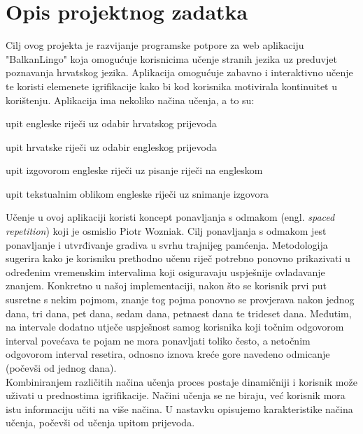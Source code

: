 \chapter{Opis projektnog zadatka}

		Cilj ovog projekta je razvijanje programske potpore za web aplikaciju "BalkanLingo" koja omogućuje korisnicima učenje stranih jezika uz preduvjet poznavanja hrvatskog jezika. Aplikacija omogućuje zabavno i interaktivno učenje te koristi elemenete igrifikacije kako bi kod korisnika motivirala kontinuitet u korištenju.
		Aplikacija ima nekoliko načina učenja, a to su: 
		\begin{packed_item}
			\item upit engleske riječi uz odabir hrvatskog prijevoda
			\item upit hrvatske riječi uz odabir engleskog prijevoda
			\item upit izgovorom engleske riječi uz pisanje riječi na engleskom
			\item upit tekstualnim oblikom engleske riječi uz snimanje izgovora
		\end{packed_item}
\newline
		Učenje u ovoj aplikaciji koristi  koncept ponavljanja s odmakom (engl. \textit{spaced repetition}) koji je osmislio Piotr Wozniak. Cilj ponavljanja s odmakom jest ponavljanje i utvrđivanje gradiva u svrhu trajnijeg pamćenja. Metodologija sugerira kako je korisniku prethodno učenu riječ potrebno ponovno prikazivati u određenim vremenskim intervalima koji osiguravaju uspješnije ovladavanje znanjem.
		\newline
		\newline
		Konkretno u našoj implementaciji, nakon što se korisnik prvi put susretne s nekim pojmom, znanje tog pojma ponovno se provjerava nakon jednog dana, tri dana, pet dana, sedam dana, petnaest dana te trideset dana. Međutim, na intervale dodatno utječe uspješnost samog korisnika koji točnim odgovorom interval povećava te pojam ne mora ponavljati toliko često, a netočnim odgovorom interval resetira, odnosno iznova kreće gore navedeno odmicanje (počevši od jednog dana). 
		\\
		\noindent Kombiniranjem različitih načina učenja proces postaje dinamičniji i korisnik može uživati u prednostima igrifikacije. Načini učenja se ne biraju, već korisnik mora istu informaciju učiti na više načina. U nastavku opisujemo karakteristike načina učenja, počevši od učenja upitom prijevoda.
		\\

